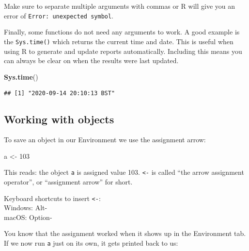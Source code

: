 \documentclass[
  12pt,
  krantz2]{krantz}
\makeatletter
\newenvironment{Shaded}{\begin{snugshade}}{\end{snugshade}}
\newcommand{\DecValTok}[1]{\textcolor[rgb]{0.00,0.00,0.81}{#1}}
\newcommand{\KeywordTok}[1]{\textcolor[rgb]{0.13,0.29,0.53}{\textbf{#1}}}
\newcommand{\NormalTok}[1]{#1}
\newcommand{\StringTok}[1]{\textcolor[rgb]{0.31,0.60,0.02}{#1}}
\renewenvironment{quote}{\begin{VF}}{\end{VF}}
\newenvironment{kframe}{%
\medskip{}
\setlength{\fboxsep}{.8em}
 \def\at@end@of@kframe{}%
 \ifinner\ifhmode%
  \def\at@end@of@kframe{\end{minipage}}%
  \begin{minipage}{\columnwidth}%
 \fi\fi%
 \def\FrameCommand##1{\hskip\@totalleftmargin \hskip-\fboxsep
 \colorbox{shadecolor}{##1}\hskip-\fboxsep
     \hskip-\linewidth \hskip-\@totalleftmargin \hskip\columnwidth}%
 \MakeFramed {\advance\hsize-\width
   \@totalleftmargin\z@ \linewidth\hsize
   \@setminipage}}%
 {\par\unskip\endMakeFramed%
 \at@end@of@kframe}
\renewenvironment{Shaded}{\begin{kframe}}{\end{kframe}}
\makeatother
\begin{document}
\begin{quote}
Make sure to separate multiple arguments with commas or R will give you an error of \texttt{Error:\ unexpected\ symbol}.
\end{quote}

Finally, some functions do not need any arguments to work.
A good example is the \texttt{Sys.time()} which returns the current time and date.
This is useful when using R to generate and update reports automatically.
Including this means you can always be clear on when the results were last updated.


\begin{Shaded}
\begin{Highlighting}[]
\KeywordTok{Sys.time}\NormalTok{()}
\end{Highlighting}
\end{Shaded}

\begin{verbatim}
## [1] "2020-09-14 20:10:13 BST"
\end{verbatim}

\hypertarget{working-with-objects}{%
\subsection{Working with objects}\label{working-with-objects}}

To save an object in our Environment we use the assignment arrow:

\begin{Shaded}
\begin{Highlighting}[]
\NormalTok{a <-}\StringTok{ }\DecValTok{103}
\end{Highlighting}
\end{Shaded}

This reads: the object \texttt{a} is assigned value 103.
\texttt{\textless{}-} is called ``the arrow assignment operator'', or ``assignment arrow'' for short.

\begin{quote}
Keyboard shortcuts to insert \texttt{\textless{}-}:\\
Windows: Alt-\\
macOS: Option-
\end{quote}

You know that the assignment worked when it shows up in the Environment tab.
If we now run \texttt{a} just on its own, it gets printed back to us:
\end{document}
